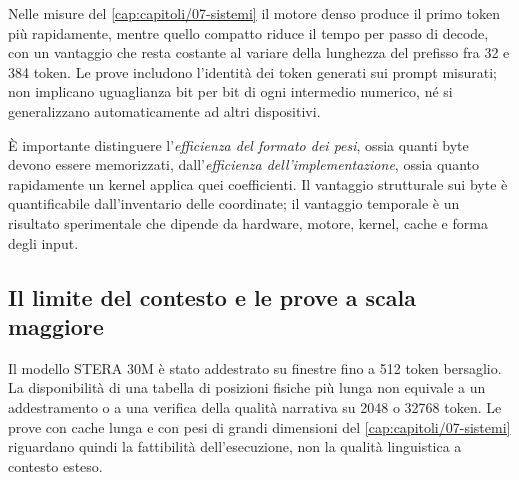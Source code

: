 Nelle misure del \autoref{cap:capitoli/07-sistemi} il motore denso produce il primo token più rapidamente, mentre quello compatto riduce il tempo per passo di decode, con un vantaggio che resta costante al variare della lunghezza del prefisso fra 32 e 384 token. Le prove includono l'identità dei token generati sui prompt misurati; non implicano uguaglianza bit per bit di ogni intermedio numerico, né si generalizzano automaticamente ad altri dispositivi.

È importante distinguere l'\emph{efficienza del formato dei pesi}, ossia quanti byte devono essere memorizzati, dall'\emph{efficienza dell'implementazione}, ossia quanto rapidamente un kernel applica quei coefficienti. Il vantaggio strutturale sui byte è quantificabile dall'inventario delle coordinate; il vantaggio temporale è un risultato sperimentale che dipende da hardware, motore, kernel, cache e forma degli input.

\subsection{Il limite del contesto e le prove a scala maggiore}

Il modello STERA 30M è stato addestrato su finestre fino a 512 token bersaglio. La disponibilità di una tabella di posizioni fisiche più lunga non equivale a un addestramento o a una verifica della qualità narrativa su 2048 o 32768 token. Le prove con cache lunga e con pesi di grandi dimensioni del \autoref{cap:capitoli/07-sistemi} riguardano quindi la fattibilità dell'esecuzione, non la qualità linguistica a contesto esteso.
